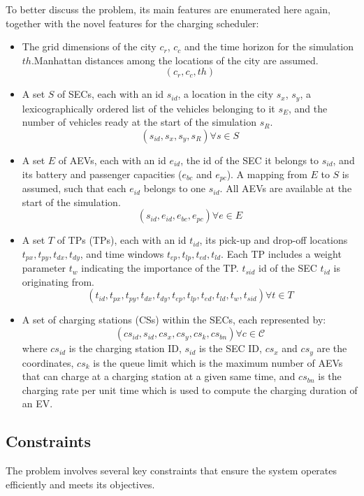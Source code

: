 To better discuss the problem, its main features are enumerated here again, together with the novel features for the charging scheduler:
\begin{itemize}
    \item The grid dimensions of the city $c_r$, $c_c$ and the time horizon for the simulation $th$.Manhattan distances among the locations of the city are assumed.
    \[
    (c_r, c_c, th)
    \]
    \item A set $S$ of SECs, each with an id $s_{id}$, a location in the city $s_x$, $s_y$, a lexicographically ordered list of the vehicles belonging to it $s_E$, and the number of vehicles ready at the start of the simulation $s_R$.
    \[
    (s_{id}, s_x, s_y, s_R) \forall s \in S
    \]
    \item A set $E$ of AEVs, each with an id $e_{id}$, the id of the SEC it belongs to $s_{id}$, and its battery and passenger capacities ($e_{bc}$ and $e_{pc}$). A mapping from $E$ to $S$ is assumed, such that each $e_{id}$ belongs to one $s_{id}$. All AEVs are available at the start of the simulation.
    \[
    (s_{id}, e_{id}, e_{bc}, e_{pc}) \forall e \in E
    \]
    \item A set $T$ of TPs (TPs), each with an id $t_{id}$, its pick-up and drop-off locations $t_{px}, t_{py}, t_{dx}, t_{dy}$, and time windows $t_{ep}, t_{lp}, t_{ed}, t_{ld}$. Each TP includes a weight parameter $t_{w}$ indicating the importance of the TP. $t_{sid}$ id of the SEC $t_{id}$ is originating from. 
    \[
    (t_{id}, t_{px}, t_{py}, t_{dx}, t_{dy}, t_{ep}, t_{lp}, t_{ed}, t_{ld}, t_{w}, t_{sid}) \forall t \in T
    \]
    \item A set of charging stations (CSs) within the SECs, each represented by:
    \[
    (cs_{id}, s_{id}, cs_x, cs_y, cs_k, cs_{bn}) \forall c \in \mathcal{C}
    \]
    where $cs_{id}$ is the charging station ID, $s_{id}$ is the SEC ID, $cs_x$ and $cs_y$ are the coordinates, $cs_k$ is the queue limit which is the maximum number of AEVs that can charge at a charging station at a given same time, and $cs_{bn}$ is the charging rate per unit time which is used to compute the charging duration of an EV.
\end{itemize}

\subsection{Constraints}

The problem involves several key constraints that ensure the system operates efficiently and meets its objectives.

